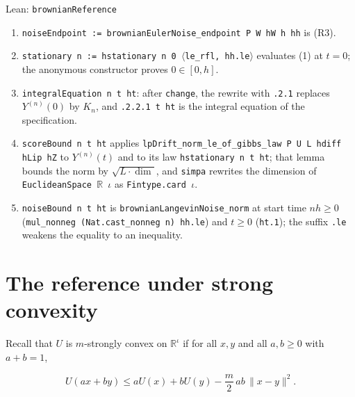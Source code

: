 \documentclass[11pt,a4paper]{article}
\begin{document}
\begin{leanbox}{Lean: \texttt{brownianReference}}
\begin{enumerate}
\item \texttt{noise\allowbreak{}Endpoint := brownian\allowbreak{}Euler\allowbreak{}Noise\_\allowbreak{}endpoint P W h\allowbreak{}W h hh} is (R3).

\item \texttt{stationary n := hstationary n 0 \ensuremath{\langle}le\_\allowbreak{}rfl, hh.\allowbreak{}le\ensuremath{\rangle}} evaluates (1) at \(t=0\); the anonymous constructor proves \(0\in[0,h]\).

\item \texttt{integral\allowbreak{}Equation n t ht}: after \texttt{change}, the rewrite with \texttt{.\allowbreak{}2.\allowbreak{}1} replaces \(Y^{(n)}(0)\) by \(K_n\), and \texttt{.\allowbreak{}2.\allowbreak{}2.\allowbreak{}1 t ht} is the integral equation of the specification.

\item \texttt{score\allowbreak{}Bound n t ht} applies \texttt{lp\allowbreak{}Drift\_\allowbreak{}norm\_\allowbreak{}le\_\allowbreak{}of\_\allowbreak{}gibbs\_\allowbreak{}law P U L hdiff h\allowbreak{}Lip h\allowbreak{}Z} to \(Y^{(n)}(t)\) and to its law \texttt{hstationary n t ht}; that lemma bounds the norm by \(\sqrt{L\cdot\dim}\), and \texttt{simpa} rewrites the dimension of \texttt{Euclidean\allowbreak{}Space \ensuremath{\mathbb R} \ensuremath{\iota}} as \texttt{Fintype.\allowbreak{}card \ensuremath{\iota}}.

\item \texttt{noise\allowbreak{}Bound n t ht} is \texttt{brownian\allowbreak{}Langevin\allowbreak{}Noise\_\allowbreak{}norm} at start time \(nh\ge0\) (\texttt{mul\_\allowbreak{}nonneg (Nat.\allowbreak{}cast\_\allowbreak{}nonneg n) hh.\allowbreak{}le}) and \(t\ge0\) (\texttt{ht.\allowbreak{}1}); the suffix \texttt{.\allowbreak{}le} weakens the equality to an inequality.

\end{enumerate}
\end{leanbox}

\section{\texorpdfstring{The reference under strong convexity}{The reference under strong convexity}}


Recall that \(U\) is \(m\)-strongly convex on \(\mathbb R^\iota\) if for all \(x,y\) and all \(a,b\ge0\) with \(a+b=1\),


\[U(ax+by)\le aU(x)+bU(y)-\frac m2\,ab\,\|x-y\|^2 .\]
\end{document}

